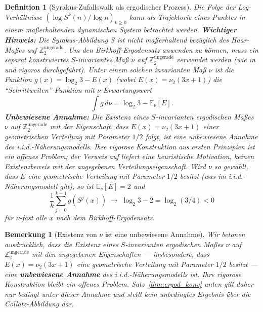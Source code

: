 \documentclass[12pt,a4paper]{article}
\newtheorem{definition}[theorem]{Definition}
\newtheorem{remark}[theorem]{Bemerkung}
\begin{document}
\begin{definition}[Syrakus-Zufallswalk als ergodischer Prozess]\label{def:ergodisch_rw}
Die Folge der Log-Verhältnisse $(\log S^k(n) / \log n)_{k \geq 0}$ kann als Trajektorie
eines Punktes in einem maßerhaltenden dynamischen System betrachtet werden.
\textbf{Wichtiger Hinweis:} Die Syrakus-Abbildung $S$ ist \emph{nicht} maßerhaltend
bezüglich des Haar-Maßes auf $\mathbb{Z}_2^{\text{ungerade}}$.
Um den Birkhoff-Ergodensatz anwenden zu können, muss ein separat konstruiertes
$S$-invariantes Maß $\nu$ auf $\mathbb{Z}_2^{\text{ungerade}}$ verwendet werden
(wie in \cite{Tao2022} und \cite{Kontorovich2010} rigoros durchgeführt).
Unter einem solchen invarianten Maß $\nu$ ist die Funktion
$g(x) = \log_2 3 - E(x)$ (wobei $E(x) = \nu_2(3x+1)$) die ``Schrittweiten''-Funktion
mit $\nu$-Erwartungswert
\[
  \int g\, d\nu = \log_2 3 - \mathbb{E}_\nu[E].
\]
\textbf{Unbewiesene Annahme:} Die Existenz eines $S$-invarianten ergodischen Maßes $\nu$
auf $\mathbb{Z}_2^{\text{ungerade}}$ mit der Eigenschaft, dass $E(x) = \nu_2(3x+1)$ einer
geometrischen Verteilung mit Parameter $1/2$ folgt, ist eine \emph{unbewiesene Annahme}
des i.i.d.-Näherungsmodells. Ihre rigorose Konstruktion aus ersten Prinzipien ist ein
offenes Problem; der Verweis auf \cite{Kontorovich2010} liefert eine heuristische
Motivation, keinen Existenzbeweis mit der angegebenen Verteilungseigenschaft.
Wird $\nu$ so gewählt, dass $E$ eine geometrische Verteilung mit Parameter $1/2$ besitzt
(was im i.i.d.-Näherungsmodell gilt), so ist $\mathbb{E}_\nu[E] = 2$ und
\[
  \frac{1}{k} \sum_{j=0}^{k-1} g(S^j(x)) \;\longrightarrow\; \log_2 3 - 2 = \log_2(3/4) < 0
\]
für $\nu$-fast alle $x$ nach dem Birkhoff-Ergodensatz.
\end{definition}

\begin{remark}[Existenz von $\nu$ ist eine unbewiesene Annahme]\label{rem:nu_annahme}
Wir betonen ausdrücklich, dass die Existenz eines $S$-invarianten ergodischen Maßes $\nu$
auf $\mathbb{Z}_2^{\text{ungerade}}$ mit den angegebenen Eigenschaften --- insbesondere,
dass $E(x)=\nu_2(3x+1)$ eine geometrische Verteilung mit Parameter $1/2$ besitzt ---
eine \textbf{unbewiesene Annahme} des i.i.d.-Näherungsmodells ist. Ihre rigorose
Konstruktion bleibt ein offenes Problem. Satz~\ref{thm:ergod_konv} unten gilt daher
nur \emph{bedingt} unter dieser Annahme und stellt kein unbedingtes Ergebnis über die
Collatz-Abbildung dar.
\end{remark}
\end{document}
